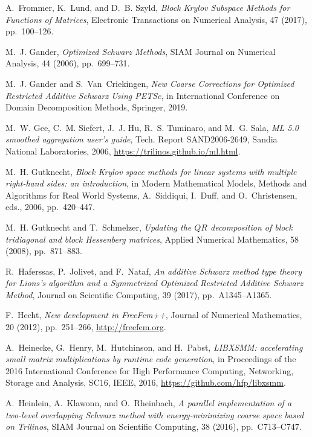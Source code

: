 \documentclass[3p,11pt]{elsarticle}
\begin{document}
\begin{thebibliography}{10}
{\sc A.~Frommer, K.~Lund, and D.~B. Szyld}, {\em {Block Krylov Subspace Methods
  for Functions of Matrices}}, Electronic Transactions on Numerical Analysis,
  47 (2017), pp.~100--126.

{\sc M.~J. Gander}, {\em Optimized {S}chwarz {M}ethods}, SIAM Journal on
  Numerical Analysis, 44 (2006), pp.~699--731.

{\sc M.~J. Gander and S.~Van~Criekingen}, {\em {New Coarse Corrections for
  Optimized Restricted Additive Schwarz Using PETSc}}, in International
  Conference on Domain Decomposition Methods, Springer, 2019.

{\sc M.~W. Gee, C.~M. Siefert, J.~J. Hu, R.~S. Tuminaro, and M.~G. Sala}, {\em
  {ML} 5.0 smoothed aggregation user's guide}, Tech. Report SAND2006-2649,
  Sandia National Laboratories, 2006, \url{https://trilinos.github.io/ml.html}.

{\sc M.~H. Gutknecht}, {\em Block {K}rylov space methods for linear systems
  with multiple right-hand sides: an introduction}, in Modern Mathematical
  Models, Methods and Algorithms for Real World Systems, A.~Siddiqui, I.~Duff,
  and O.~Christensen, eds., 2006, pp.~420--447.

{\sc M.~H. Gutknecht and T.~Schmelzer}, {\em {Updating the $QR$ decomposition
  of block tridiagonal and block Hessenberg matrices}}, {Applied Numerical
  Mathematics}, 58 (2008), pp.~871--883.

{\sc R.~Haferssas, P.~Jolivet, and F.~Nataf}, {\em {An additive Schwarz method
  type theory for Lions's algorithm and a Symmetrized Optimized Restricted
  Additive Schwarz Method}}, Journal on Scientific Computing, 39 (2017),
  pp.~A1345--A1365.

{\sc F.~Hecht}, {\em New development in {FreeFem++}}, Journal of Numerical
  Mathematics, 20 (2012), pp.~251--266, \url{http://freefem.org}.

{\sc A.~Heinecke, G.~Henry, M.~Hutchinson, and H.~Pabst}, {\em {LIBXSMM:
  accelerating small matrix multiplications by runtime code generation}}, in
  Proceedings of the 2016 International Conference for High Performance
  Computing, Networking, Storage and Analysis, SC16, IEEE, 2016,
  \url{https://github.com/hfp/libxsmm}.

{\sc A.~Heinlein, A.~Klawonn, and O.~Rheinbach}, {\em A parallel implementation
  of a two-level overlapping {S}chwarz method with energy-minimizing coarse
  space based on {T}rilinos}, SIAM Journal on Scientific Computing, 38 (2016),
  pp.~C713--C747.


\end{thebibliography}
\end{document}
